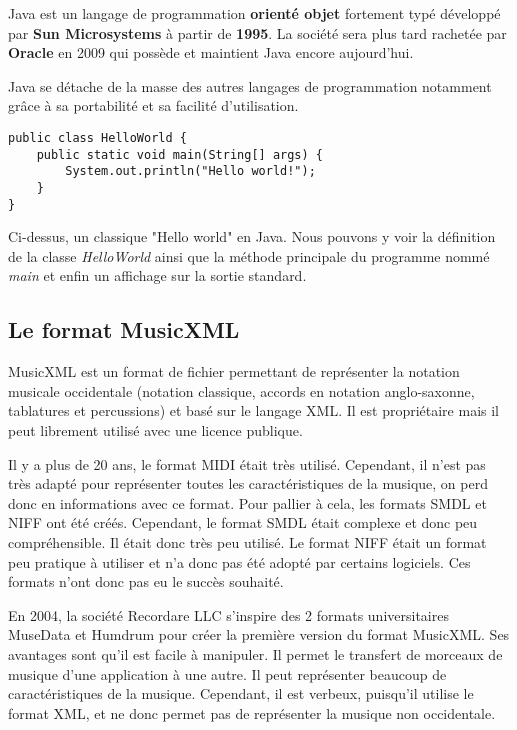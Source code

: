 \par 
Java \cite{java_oracle} est un langage de programmation \textbf{orienté objet} fortement typé développé par \textbf{Sun Microsystems} à partir de \textbf{1995}. La société sera plus tard rachetée par \textbf{Oracle} en 2009 qui possède et maintient Java encore aujourd'hui.

\par 
Java se détache de la masse des autres langages de programmation notamment grâce à sa portabilité et sa facilité d'utilisation.

\begin{lstlisting}[caption=Hello world en java]
public class HelloWorld {
    public static void main(String[] args) {
        System.out.println("Hello world!");
    }
}
\end{lstlisting}

\par
Ci-dessus, un classique "Hello world" en Java. Nous pouvons y voir la définition de la classe \emph{HelloWorld} ainsi que la méthode principale du programme nommé \emph{main} et enfin un affichage sur la sortie standard.



\subsection{Le format MusicXML}

MusicXML \cite{musicxml} est un format de fichier permettant de représenter la notation musicale occidentale (notation classique, accords en notation anglo-saxonne, tablatures et percussions) et basé sur le langage XML. Il est propriétaire mais il peut librement utilisé avec une licence publique.

\par
Il y a plus de 20 ans, le format MIDI était très utilisé. Cependant, il n’est pas très adapté pour représenter toutes les caractéristiques de la musique, on perd donc en informations avec ce format. Pour pallier à cela, les formats SMDL et NIFF ont été créés. Cependant, le format SMDL était complexe et donc peu compréhensible. Il était donc très peu utilisé. Le format NIFF était un format peu pratique à utiliser et n’a donc pas été adopté par certains logiciels. Ces formats n’ont donc pas eu le succès souhaité.

\par
En 2004, la société Recordare LLC s’inspire des 2 formats universitaires MuseData et Humdrum pour créer la première version du format MusicXML. Ses avantages sont qu’il est facile à manipuler. Il permet le transfert de morceaux de musique d’une application à une autre. Il peut représenter beaucoup de caractéristiques de la musique. Cependant, il est verbeux, puisqu'il utilise le format XML, et ne donc permet pas de représenter la musique non occidentale.

